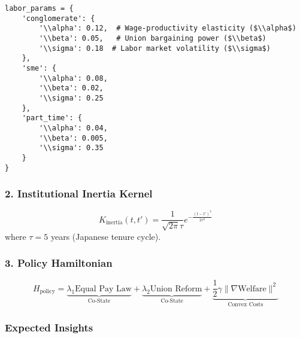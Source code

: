 \documentclass[10pt]{article}
\theoremstyle{definition}
\begin{document}
\begin{lstlisting}[caption={Labor Parameter Dictionary in Python}]
labor_params = {
    'conglomerate': {
        '\\alpha': 0.12,  # Wage-productivity elasticity ($\\alpha$)
        '\\beta': 0.05,   # Union bargaining power ($\\beta$)
        '\\sigma': 0.18  # Labor market volatility ($\\sigma$)
    },
    'sme': {
        '\\alpha': 0.08,
        '\\beta': 0.02,
        '\\sigma': 0.25
    },
    'part_time': {
        '\\alpha': 0.04,
        '\\beta': 0.005,
        '\\sigma': 0.35
    }
}
\end{lstlisting}

\subsubsection{2. Institutional Inertia Kernel}

\begin{equation}
K_{\text{inertia}}(t, t') = \frac{1}{\sqrt{2\pi}\tau} e^{-\frac{(t-t')^2}{2\tau^2}}
\end{equation}
where $\tau = 5$ years (Japanese tenure cycle).

\subsubsection{3. Policy Hamiltonian}

\begin{equation}
H_{\text{policy}} = \underbrace{\lambda_1 \text{Equal Pay Law}}_{\text{Co-State}} + \underbrace{\lambda_2 \text{Union Reform}}_{\text{Co-State}} + \underbrace{\frac{1}{2}\gamma \|\nabla \text{Welfare}\|^2}_{\text{Convex Costs}}
\end{equation}

\subsubsection{Expected Insights}
\end{document}
